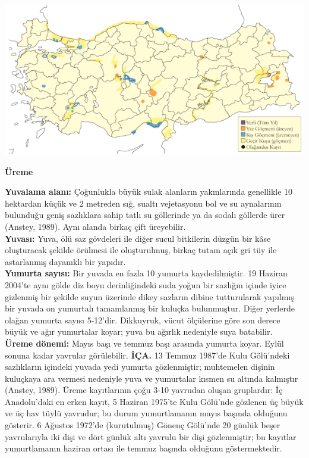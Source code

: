 \documentclass[
  a4paper,
  DIV=11,
  numbers=noendperiod]{scrreprt}
\begin{document}
\includegraphics{images/harita_Page_035.png}

\textbf{Üreme}

\textbf{Yuvalama alanı:} Çoğunlukla büyük sulak alanların yakınlarında
genellikle 10 hektardan küçük ve 2 metreden sığ, sualtı vejetasyonu bol
ve su aynalarının bulunduğu geniş sazlıklara sahip tatlı su göllerinde
ya da sodalı göllerde ürer (Anstey, 1989). Aynı alanda birkaç çift
üreyebilir.\\
\textbf{Yuvası:} Yuva, ölü saz gövdeleri ile diğer sucul bitkilerin
düzgün bir kâse oluşturacak şekilde örülmesi ile oluşturulmuş, birkaç
tutam açık gri tüy ile astarlanmış dayanıklı bir yapıdır.\\
\textbf{Yumurta sayısı:} Bir yuvada en fazla 10 yumurta kaydedilmiştir.
19 Haziran 2004'te aynı gölde diz boyu derinliğindeki suda yoğun bir
sazlığın içinde iyice gizlenmiş bir şekilde suyun üzerinde dikey
sazların dibine tutturularak yapılmış bir yuvada on yumurtalı
tamamlanmış bir kuluçka bulunmuştur. Diğer yerlerde olağan yumurta
sayısı 5-12'dir. Dikkuyruk, vücut ölçülerine göre son derece büyük ve
ağır yumurtalar koyar; yuva bu ağırlık nedeniyle suya batabilir.\\
\textbf{Üreme dönemi:} Mayıs başı ve temmuz başı arasında yumurta koyar.
Eylül sonuna kadar yavrular görülebilir. \textbf{İÇA.} 13 Temmuz 1987'de
Kulu Gölü'ndeki sazlıkların içindeki yuvada yedi yumurta gözlenmiştir;
muhtemelen dişinin kuluçkaya ara vermesi nedeniyle yuva ve yumurtalar
kısmen su altında kalmıştır (Anstey, 1989). Üreme kayıtlarının çoğu 3-10
yavrudan oluşan gruplardır: İç Anadolu'daki en erken kayıt, 5 Haziran
1975'te Kulu Gölü'nde gözlenen üç büyük ve üç hav tüylü yavrudur; bu
durum yumurtlamanın mayıs başında olduğunu gösterir. 6 Ağustos 1972'de
(kurutulmuş) Gönenç Gölü'nde 20 günlük beşer yavrularıyla iki dişi ve
dört günlük altı yavrulu bir dişi gözlenmiştir; bu kayıtlar
yumurtlamanın haziran ortası ile temmuz başında olduğunu göstermektedir.
\end{document}
